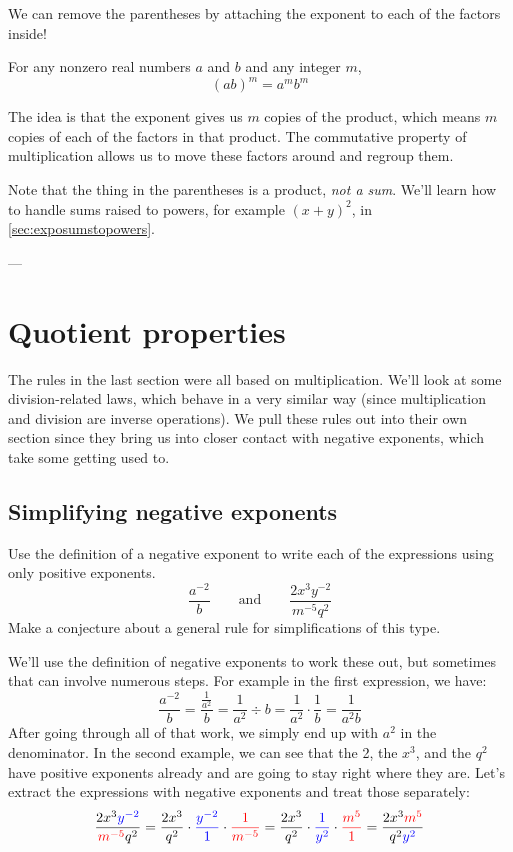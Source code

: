 We can remove the parentheses by attaching the exponent to each of the factors inside!

\begin{boxdef}
For any nonzero real numbers $a$ and $b$ and any integer $m$, \[(ab)^m = a^m b^m\]
\end{boxdef}

The idea is that the exponent gives us $m$ copies of the product, which means $m$ copies of each of the factors in that product. The commutative property of multiplication allows us to move these factors around and regroup them.

Note that the thing in the parentheses is a product, \textit{not a sum}. We'll learn how to handle sums raised to powers, for example $(x+y)^2$, in \cref{sec:exposumstopowers}.

\begin{boxex}
---
\end{boxex}


\section{Quotient properties} 
\label{sec:expoquotient}

The rules in the last section were all based on multiplication. We'll look at some division-related laws, which behave in a very similar way (since multiplication and division are inverse operations). We pull these rules out into their own section since they bring us into closer contact with negative exponents, which take some getting used to.

\subsection{Simplifying negative exponents}

\begin{boxexplore}[Derivation \#4]
Use the definition of a negative exponent to write each of the expressions using only positive exponents.
\[\frac{a^{-2}}{b} \qquad\text{and}\qquad \frac{2x^3y^{-2}}{m^{-5}q^2}\]
Make a conjecture about a general rule for simplifications of this type.
\end{boxexplore}

We'll use the definition of negative exponents to work these out, but sometimes that can involve numerous steps. For example in the first expression, we have:
\[\frac{a^{-2}}{~b~} = \frac{\frac{1}{a^2}}{~b~} = \frac{1}{a^2}\div{b} = \frac{1}{a^2}\cdot\frac{1}{b} = \frac{1}{a^2b}\]
After going through all of that work, we simply end up with $a^2$ in the denominator. In the second example, we can see that the 2, the $x^3$, and the $q^2$ have positive exponents already and are going to stay right where they are. Let's extract the expressions with negative exponents and treat those separately:
\[\frac{2x^3{\color{blue}y^{-2}}}{{\color{red}m^{-5}}q^2}
= \frac{2x^3}{q^2}\cdot{\color{blue}\frac{y^{-2}}{1}}\cdot{\color{red}\frac{1}{m^{-5}}}
= \frac{2x^3}{q^2}\cdot{\color{blue}\frac{1}{y^2}}\cdot{\color{red}\frac{m^5}{1}}
= \frac{2x^3{\color{red}m^5}}{q^2{\color{blue}y^2}}\]

